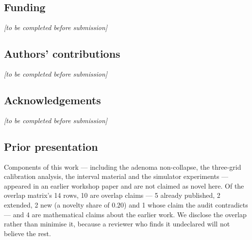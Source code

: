 \subsection*{Funding}
\textit{[to be completed before submission]}

\subsection*{Authors' contributions}
\textit{[to be completed before submission]}

\subsection*{Acknowledgements}
\textit{[to be completed before submission]}

\subsection*{Prior presentation}
Components of this work --- including the adenoma non-collapse, the three-grid
calibration analysis, the interval material and the simulator experiments ---
appeared in an earlier workshop paper and are not claimed as novel here. Of the
overlap matrix's 14 rows, 10 are overlap claims --- 5 already published, 2
extended, 2 new (a novelty share of $0.20$) and 1 whose claim the audit
contradicts --- and 4 are mathematical claims about the earlier work. We disclose
the overlap rather than minimise it, because a reviewer who finds it undeclared
will not believe the rest.
